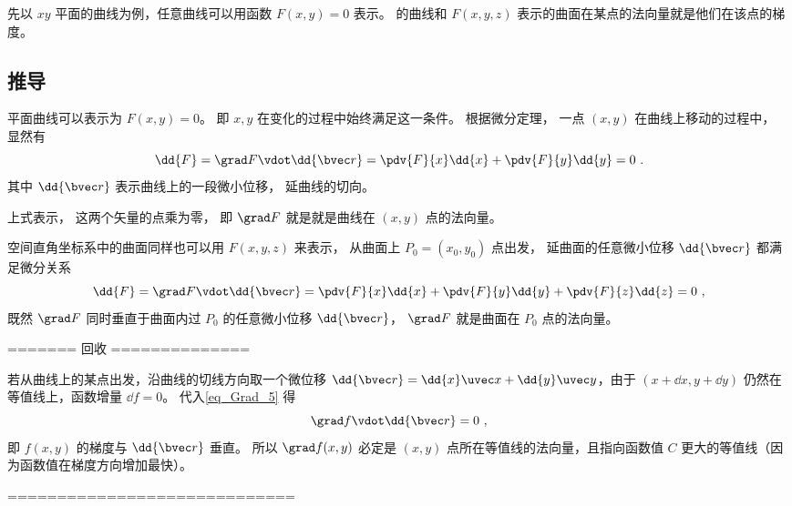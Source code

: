 
\begin{issues}
\issueDraft
\end{issues}


先以 $xy$ 平面的曲线为例，任意曲线可以用函数 $F(x, y) = 0$ 表示。 的曲线和 $F(x, y, z)$ 表示的曲面在某点的法向量就是他们在该点的梯度。

\subsection{推导}

平面曲线可以表示为 $F(x, y) = 0$。 即 $x, y$ 在变化的过程中始终满足这一条件。 根据微分定理， 一点 $(x, y)$ 在曲线上移动的过程中， 显然有
\begin{equation}
\dd{F} = \grad F \vdot \dd{\bvec r} = \pdv{F}{x} \dd{x} + \pdv{F}{y} \dd{y} = 0~.
\end{equation}
其中 $\dd{\bvec r}$ 表示曲线上的一段微小位移， 延曲线的切向。

上式表示， 这两个矢量的点乘为零， 即 $\grad F$ 就是就是曲线在 $(x,y)$ 点的法向量。

空间直角坐标系中的曲面同样也可以用 $F(x, y, z)$ 来表示， 从曲面上 $P_0 = (x_0, y_0)$ 点出发， 延曲面的任意微小位移 $\dd{\bvec r}$ 都满足微分关系
\begin{equation}
\dd{F} = \grad F \vdot \dd{\bvec r} = \pdv{F}{x} \dd{x} + \pdv{F}{y} \dd{y} + \pdv{F}{z} \dd{z} = 0~,
\end{equation}
既然 $\grad F$ 同时垂直于曲面内过 $P_0$ 的任意微小位移 $\dd{\bvec r}$， $\grad F$ 就是曲面在 $P_0$ 点的法向量。

======= 回收 ==============

若从曲线上的某点出发，沿曲线的切线方向取一个微位移 $\dd{\bvec r} = \dd{x}\uvec x + \dd{y} \uvec y$，由于 $(x+\dd{x}, y+\dd{y})$ 仍然在等值线上，函数增量 $\dd{f} = 0$。 代入\autoref{eq_Grad_5} 得
\begin{equation}
\grad f \vdot \dd{\bvec r} = 0~,
\end{equation}
即 $f(x,y)$ 的梯度与 $\dd{\bvec r}$ 垂直。 所以 $\grad f(x,y)$ 必定是 $(x,y)$ 点所在等值线的法向量，且指向函数值 $C$ 更大的等值线（因为函数值在梯度方向增加最快）。

=============================
